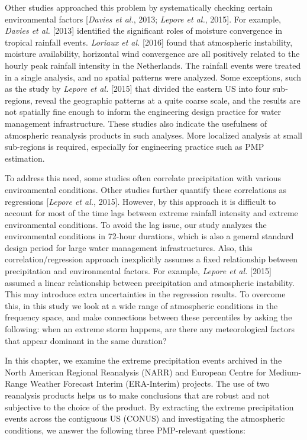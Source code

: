 Other studies approached this problem by systematically checking certain environmental factors [\textit{Davies et al.}, 2013; \textit{Lepore et al.}, 2015]. For example, \textit{Davies et al.} [2013] identified the significant roles of moisture convergence in tropical rainfall events. \textit{Loriaux et al.} [2016] found that atmospheric instability, moisture availability, horizontal wind convergence are all positively related to the hourly peak rainfall intensity in the Netherlands. The rainfall events were treated in a single analysis, and no spatial patterns were analyzed. Some exceptions, such as the study by \textit{Lepore et al.} [2015] that divided the eastern US into four sub-regions, reveal the geographic patterns at a quite coarse scale, and the results are not spatially fine enough to inform the engineering design practice for water management infrastructure. These studies also indicate the usefulness of atmospheric reanalysis products in such analyses. More localized analysis at small sub-regions is required, especially for engineering practice such as PMP estimation.

To address this need, some studies often correlate precipitation with various environmental conditions. Other studies further quantify these correlations as regressions [\textit{Lepore et al.}, 2015]. However, by this approach it is difficult to account for most of the time lags between extreme rainfall intensity and extreme environmental conditions. To avoid the lag issue, our study analyzes the environmental conditions in 72-hour durations, which is also a general standard design period for large water management infrastructures. Also, this correlation/regression approach inexplicitly assumes a fixed relationship between precipitation and environmental factors. For example, \textit{Lepore et al.} [2015] assumed a linear relationship between precipitation and atmospheric instability. This may introduce extra uncertainties in the regression results. To overcome this, in this study we look at a wide range of atmospheric conditions in the frequency space, and make connections between these percentiles by asking the following: when an extreme storm happens, are there any meteorological factors that appear dominant in the same duration?

In this chapter, we examine the extreme precipitation events archived in the North American Regional Reanalysis (NARR) and European Centre for Medium-Range Weather Forecast Interim (ERA-Interim) projects. The use of two reanalysis products helps us to make conclusions that are robust and not subjective to the choice of the product. By extracting the extreme precipitation events across the contiguous US (CONUS) and investigating the atmospheric conditions, we answer the following three PMP-relevant questions:

